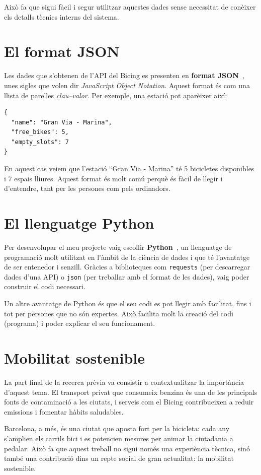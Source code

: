 Això fa que sigui fàcil i segur utilitzar aquestes dades sense necessitat de conèixer els detalls tècnics interns del sistema.

\section{El format JSON}
Les dades que s’obtenen de l’API del Bicing es presenten en \textbf{format JSON}~\cite{json-org}, unes sigles que volen dir \textit{JavaScript Object Notation}. Aquest format és com una llista de parelles \emph{clau–valor}. Per exemple, una estació pot aparèixer així:

\begin{verbatim}
{
  "name": "Gran Via - Marina",
  "free_bikes": 5,
  "empty_slots": 7
}
\end{verbatim}

En aquest cas veiem que l’estació “Gran Via - Marina” té 5 bicicletes disponibles i 7 espais lliures. Aquest format és molt comú perquè és fàcil de llegir i d’entendre, tant per les persones com pels ordinadors.

\section{El llenguatge Python}
Per desenvolupar el meu projecte vaig escollir \textbf{Python}~\cite{python-docs}, un llenguatge de programació molt utilitzat en l’àmbit de la ciència de dades i que té l’avantatge de ser entenedor i senzill. Gràcies a biblioteques com \texttt{requests} (per descarregar dades d’una API) o \texttt{json} (per treballar amb el format de les dades), vaig poder construir el codi necessari.

Un altre avantatge de Python és que el seu codi es pot llegir amb facilitat, fins i tot per persones que no són expertes. Això facilita molt la creació del codi (programa) i poder explicar el seu funcionament.

\section{Mobilitat sostenible}
La part final de la recerca prèvia va consistir a contextualitzar la importància d’aquest tema. El transport privat que consumeix benzina és una de les principals fonts de contaminació a les ciutats, i serveis com el Bicing contribueixen a reduir emissions i fomentar hàbits saludables.

Barcelona, a més, és una ciutat que aposta fort per la bicicleta: cada any s’amplien els carrils bici i es potencien mesures per animar la ciutadania a pedalar. Això fa que aquest treball no sigui només una experiència tècnica, sinó també una contribució dins un repte social de gran actualitat: la mobilitat sostenible.

